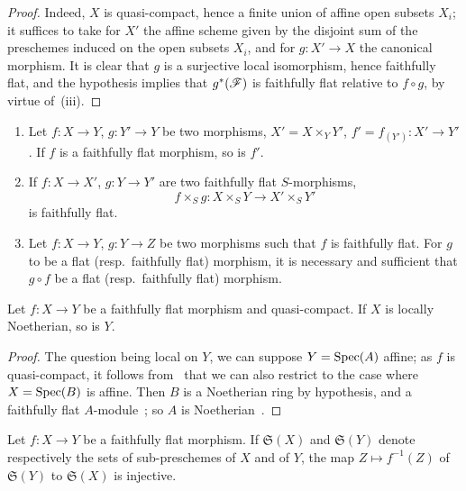 \begin{proof}
Indeed, $X$ is quasi-compact, hence a finite union of affine open subsets $X_i$; it suffices to take for $X'$ the affine scheme given by the disjoint sum of the preschemes induced on the open subsets $X_i$, and for $g:X'\to X$ the canonical morphism.
It is clear that $g$ is a surjective local isomorphism, hence faithfully flat, and the hypothesis implies that $g^*(\mathscr{F})$ is faithfully flat relative to $f\circ g$, by virtue of~\textnormal{(iii)}.
\end{proof}

\begin{corollary}[2.2.13]
\label{IV.2.2.13}
\medskip\noindent
\begin{enumerate}
  \item[\textnormal{(i)}] Let $f:X\to Y$, $g:Y'\to Y$ be two morphisms, $X'=X\times_Y Y'$, $f'=f_{(Y')}:X'\to Y'$.
    If $f$ is a faithfully flat morphism, so is $f'$.
  \item[\textnormal{(ii)}] If $f:X\to X'$, $g:Y\to Y'$ are two faithfully flat $S$-morphisms,
    \[
      f\times_S g: X\times_S Y \to X'\times_S Y'
    \]
    is faithfully flat.
  \item[\textnormal{(iii)}] Let $f:X\to Y$, $g:Y\to Z$ be two morphisms such that $f$ is faithfully flat.
    For $g$ to be a flat \textnormal{(}resp.\ faithfully flat\textnormal{)} morphism, it is necessary and sufficient that $g\circ f$ be a flat \textnormal{(}resp.\ faithfully flat\textnormal{)} morphism.
\end{enumerate}
\end{corollary}

\begin{proposition}[2.2.14]
\label{IV.2.2.14}
Let $f:X\to Y$ be a faithfully flat morphism and quasi-compact.
If $X$ is locally Noetherian, so is $Y$.
\end{proposition}

\begin{proof}
The question being local on $Y$, we can suppose $Y=\operatorname{Spec}(A)$ affine; as $f$ is quasi-compact, it follows from~ that we can also restrict to the case where $X=\operatorname{Spec}(B)$ is affine.
Then $B$ is a Noetherian ring by hypothesis, and a faithfully flat $A$-module~; so $A$ is Noetherian~.
\end{proof}

\begin{proposition}[2.2.15]
\label{IV.2.2.15}
Let $f:X\to Y$ be a faithfully flat morphism.
If $\mathfrak{S}(X)$ and $\mathfrak{S}(Y)$ denote respectively the sets of sub-preschemes of $X$ and of $Y$, the map $Z\mapsto f^{-1}(Z)$ of $\mathfrak{S}(Y)$ to $\mathfrak{S}(X)$ is injective.
\end{proposition}

